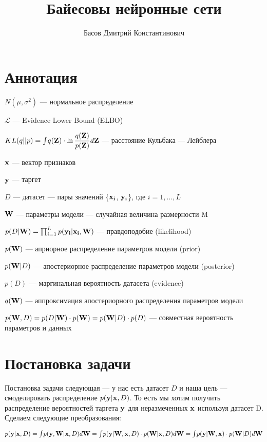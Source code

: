 \documentclass{article}
\title{Байесовы нейронные сети}
\author{Басов Дмитрий Константинович}
\date{}
\begin{document}
\maketitle

\section{Аннотация}
$N(\mu, \sigma^2)$ — нормальное распределение

$\mathcal{L}$ — Evidence Lower Bound (ELBO)

$KL(q || p) = \int_{}{} q(\bold{Z}) \cdot \ln{\dfrac{q(\bold{Z})}{p(\bold{Z})}} d\bold{Z}$ — расстояние Кульбака — Лейблера

$\bold{x}$ — вектор признаков

$\bold{y}$ — таргет

$D$ — датасет — пары значений \{$\bold{x_i}$, $\bold{y_i}$\}, где $i = 1, \dots, L$

$\bold{W}$ — параметры модели — случайная величина размерности M

$p(D | \bold{W}) = \prod_{i=1}^{L} p(\bold{y_i} | \bold{x_i}, \bold{W})$ — правдоподобие (likelihood)

$p(\bold{W})$ — априорное распределение параметров модели (prior)

$p(\bold{W}| D)$ — апостериорное распределение параметров модели (posterior)

$p(D)$ — маргинальная вероятность датасета (evidence)

$q(\bold{W})$ — аппроксимация апостериорного распределения параметров модели

$p(\bold{W}, D) =
p(D | \bold{W}) \cdot p(\bold{W}) =
p(\bold{W}| D)\cdot p(D)$
— совместная вероятность параметров и данных

\section{Постановка задачи}
Постановка задачи следующая — у нас есть датасет $D$ и наша цель — смоделировать распределение $p(\bold{y} | \bold{x}, D)$. То есть мы хотим получить распределение вероятностей таргета $\bold{y}$ для неразмеченных $\bold{x}$ используя датасет D. Сделаем следующие преобразования:

$p(\bold{y} | \bold{x}, D) =
\int_{}{} p(\bold{y}, \bold{W} | \bold{x}, D) d\bold{W} =
\int_{}{} p(\bold{y} | \bold{W}, \bold{x}, D) \cdot p(\bold{W} | \bold{x}, D) d\bold{W} = 
\int_{}{} p(\bold{y} | \bold{W}, \bold{x}) \cdot p(\bold{W} | D) d\bold{W}$
\end{document}
